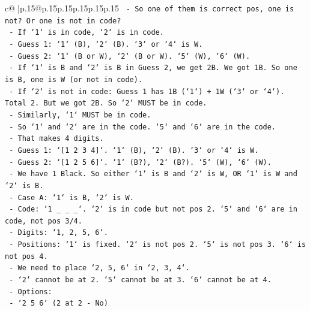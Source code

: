 \documentclass{article}
\begin{document}
{\begin{supertabular}{c@{$\;$}|p{.15\linewidth}@{}p{.15\linewidth}p{.15\linewidth}p{.15\linewidth}p{.15\linewidth}p{.15\linewidth}}
{{{\texttt{                        {-} So one of them is correct pos, one is not? Or one is not in code?} \\
\texttt{                        {-} If `1` is in code, `2` is in code.} \\
\texttt{                        {-} Guess 1: `1` (B), `2` (B). `3` or `4` is W.} \\
\texttt{                        {-} Guess 2: `1` (B or W), `2` (B or W). `5` (W), `6` (W).} \\
\texttt{                        {-} If `1` is B and `2` is B in Guess 2, we get 2B. We got 1B. So one is B, one is W (or not in code).} \\
\texttt{                        {-} If `2` is not in code: Guess 1 has 1B (`1`) + 1W (`3` or `4`). Total 2. But we got 2B. So `2` MUST be in code.} \\
\texttt{                        {-} Similarly, `1` MUST be in code.} \\
\texttt{                        {-} So `1` and `2` are in the code. `5` and `6` are in the code.} \\
\texttt{                        {-} That makes 4 digits.} \\
\texttt{                        {-} Guess 1: `{[}1 2 3 4{]}`. `1` (B), `2` (B). `3` or `4` is W.} \\
\texttt{                        {-} Guess 2: `{[}1 2 5 6{]}`. `1` (B?), `2` (B?). `5` (W), `6` (W).} \\
\texttt{                        {-} We have 1 Black. So either `1` is B and `2` is W, OR `1` is W and `2` is B.} \\
\texttt{                        {-} Case A: `1` is B, `2` is W.} \\
\texttt{                            {-} Code: `1 \_ \_ \_`. `2` is in code but not pos 2. `5` and `6` are in code, not pos 3/4.} \\
\texttt{                            {-} Digits: `1, 2, 5, 6`.} \\
\texttt{                            {-} Positions: `1` is fixed. `2` is not pos 2. `5` is not pos 3. `6` is not pos 4.} \\
\texttt{                            {-} We need to place `2, 5, 6` in `2, 3, 4`.} \\
\texttt{                            {-} `2` cannot be at 2. `5` cannot be at 3. `6` cannot be at 4.} \\
\texttt{                            {-} Options:} \\
\texttt{                                {-} `2 5 6` (2 at 2 {-} No)} \\
}}}
\end{supertabular}}
\end{document}
